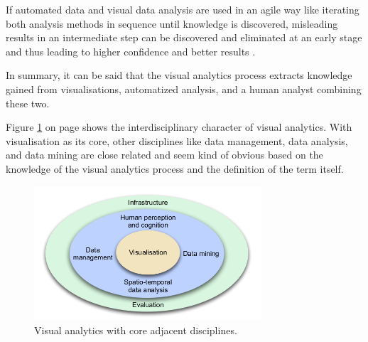 If automated data and visual data analysis are used in an agile way like iterating both analysis methods in sequence until knowledge is discovered, misleading results in an intermediate step can be discovered and eliminated at an early stage and thus leading to higher confidence and better results .

In summary, it can be said that the visual analytics process extracts knowledge gained from visualisations, automatized analysis, and a human analyst combining these two.

Figure \ref{fig:va-related} on page \pageref{fig:va-related} shows the interdisciplinary character of visual analytics. With visualisation as its core, other disciplines like data management, data analysis, and data mining are close related and seem kind of obvious based on the knowledge of the visual analytics process and the definition of the term itself.

\begin{figure}[!htb]
\centering
\includegraphics[height=5cm,keepaspectratio]{images/va/va-related.png}
\caption[
    Visual analytics with core adjacent disciplines .
]{Visual analytics with core adjacent disciplines.}
\label{fig:va-related}
\end{figure}